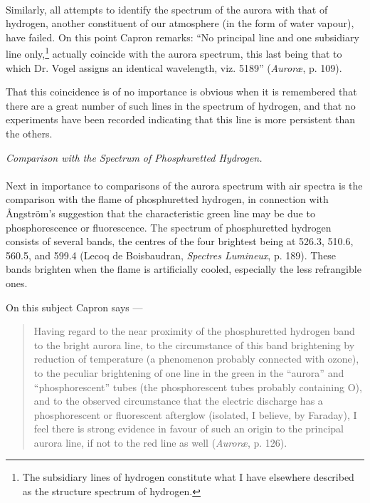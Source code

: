 \documentclass[a4paper, 12pt, oneside, polutonikogreek, english]{article}
\begin{document}
\paragraph{}
Similarly, all attempts to identify the spectrum of the aurora with that of hydrogen, another constituent of our atmosphere (in the form of water vapour), have failed. On this point Capron remarks: ``No principal line and one subsidiary line only,\footnote{The subsidiary lines of hydrogen constitute what I have elsewhere described as the structure spectrum of hydrogen.} actually coincide with the aurora spectrum, this last being that to which Dr. Vogel assigns an identical wavelength, viz. 5189'' (\emph{Auroræ}, p. 109).

That this coincidence is of no importance is obvious when it is remembered that there are a great number of such lines in the spectrum of hydrogen, and that no experiments have been recorded indicating that this line is more persistent than the others.
\begin{center}
\emph{Comparison with the Spectrum of Phosphuretted Hydrogen.}
\end{center}
\paragraph{}
Next in importance to comparisons of the aurora spectrum with air spectra is the comparison with the flame of phosphuretted hydrogen, in connection with Ångström's suggestion that the characteristic green line may be due to phosphorescence or fluorescence. The spectrum of phosphuretted hydrogen consists of several bands, the centres of the four brightest being at 526.3, 510.6, 560.5, and 599.4 (Lecoq de Boisbaudran, \emph{Spectres Lumineux}, p. 189). These bands brighten when the flame is artificially cooled, especially the less refrangible ones.

On this subject Capron says ---
\begin{quotation}
Having regard to the near proximity of the phosphuretted hydrogen band to the bright aurora line, to the circumstance of this band brightening by reduction of temperature (a phenomenon probably connected with ozone), to the peculiar brightening of one line in the green in the ``aurora'' and ``phosphorescent'' tubes (the phosphorescent tubes probably containing O), and to the observed circumstance that the electric discharge has a phosphorescent or fluorescent afterglow (isolated, I believe, by Faraday), I feel there is strong evidence in favour of such an origin to the principal aurora line, if not to the red line as well (\emph{Auroræ}, p. 126).
\end{quotation}
\end{document}
